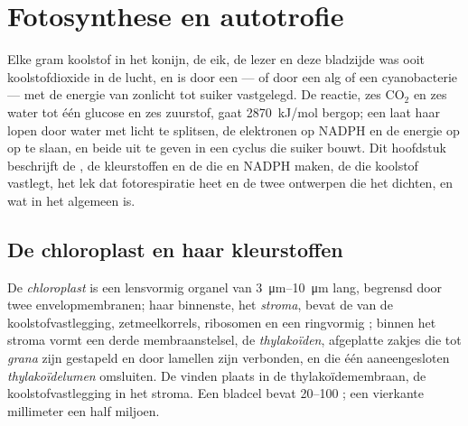 \chapter{Fotosynthese en autotrofie}\label{ch:b1:photosynthesis}

Elke gram koolstof in het konijn, de eik, de lezer en deze bladzijde was ooit
koolstofdioxide in de lucht, en is door een  --- of door een alg of een
cyanobacterie --- met de energie van zonlicht tot suiker vastgelegd. De reactie,
zes $\mathrm{CO_2}$ en zes water tot één glucose en zes zuurstof, gaat
\qty{2870}{kJ/mol} bergop; een  laat haar lopen door water met licht te
splitsen, de elektronen op NADPH en de energie op  op te slaan, en beide uit te
geven in een cyclus die suiker bouwt. Dit hoofdstuk beschrijft de , de
kleurstoffen en de  die  en NADPH maken, de  die
koolstof vastlegt, het lek dat fotorespiratie heet en de twee ontwerpen die het
dichten, en wat  in het algemeen is.

\section{De chloroplast en haar kleurstoffen}

\begin{definition}[Chloroplast]\label{def:b1:photosynthesis:chloroplast}
De \emph{chloroplast} is een lensvormig organel van
\qtyrange{3}{10}{\micro m} lang, begrensd door twee envelopmembranen; haar
binnenste, het \emph{stroma}, bevat de  van de
koolstofvastlegging, zetmeelkorrels, ribosomen en een ringvormig ; binnen het
stroma vormt een derde membraanstelsel, de \emph{thylakoïden},
afgeplatte zakjes die tot \emph{grana} zijn gestapeld en door lamellen zijn
verbonden, en die één aaneengesloten \emph{thylakoïdelumen} omsluiten. De
 vinden plaats in de thylakoïdemembraan, de koolstofvastlegging in het
stroma. Een bladcel bevat \qtyrange{20}{100}{} ; een vierkante
millimeter  een half miljoen.
\end{definition}

